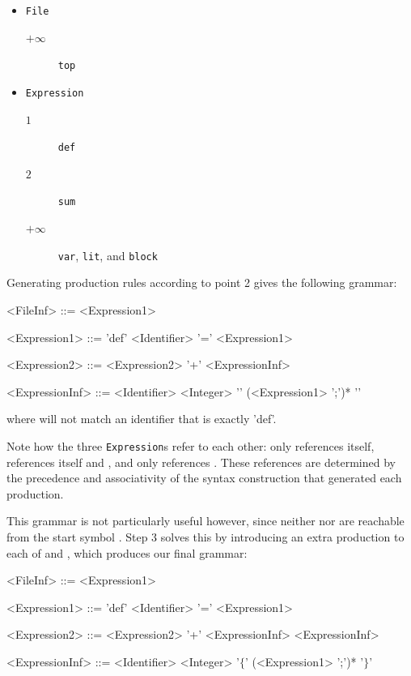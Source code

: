 \documentclass{kththesis}
\begin{document}
\begin{itemize}
  \item \texttt{File}
  \begin{description}
    \item[$+\infty$] \texttt{top}
  \end{description}

  \item \texttt{Expression}
  \begin{description}
    \item[$1$] \texttt{def}
    \item[$2$] \texttt{sum}
    \item[$+\infty$] \texttt{var}, \texttt{lit}, and \texttt{block}
  \end{description}
\end{itemize}

Generating production rules according to point 2 gives the following grammar:

\setlength{\grammarindent}{9em}
\begin{grammar}
<FileInf> ::= <Expression1>

<Expression1> ::= 'def' <Identifier> '=' <Expression1>

<Expression2> ::= <Expression2> '+' <ExpressionInf>

<ExpressionInf> ::= <Identifier>
  \alt <Integer>
  \alt '{' (<Expression1> ';')* '}'
\end{grammar}

where  will not match an identifier that is exactly 'def'.

Note how the three \texttt{Expression}s refer to each other:  only references itself,  references itself and , and  only references . These references are determined by the precedence and associativity of the syntax construction that generated each production.

This grammar is not particularly useful however, since neither  nor  are reachable from the start symbol . Step 3 solves this by introducing an extra production to each of  and , which produces our final grammar:

\setlength{\grammarindent}{9em}
\begin{grammar}
<FileInf> ::= <Expression1>

<Expression1> ::= 'def' <Identifier> '=' <Expression1>

<Expression2> ::= <Expression2> '+' <ExpressionInf>
  \alt <ExpressionInf>

<ExpressionInf> ::= <Identifier>
  \alt <Integer>
  \alt '$\{$' (<Expression1> ';')* '$\}$'
\end{grammar}
\end{document}
